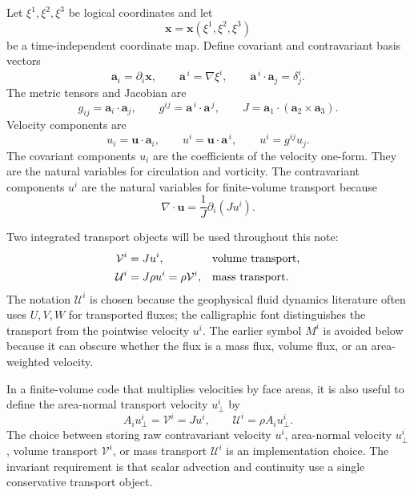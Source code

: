 \documentclass[11pt]{article}
\newcommand{\pd}{\partial}
\newcommand{\bvec}[1]{\bm{#1}}
\newcommand{\mc}[1]{\mathcal{#1}}
\newcommand{\Vflux}{\mc{V}}
\newcommand{\Uflux}{\mc{U}}
\begin{document}
Let \(\xi^1,\xi^2,\xi^3\) be logical coordinates and let
\begin{equation}
  \bvec{x}=\bvec{x}(\xi^1,\xi^2,\xi^3)
\end{equation}
be a time-independent coordinate map.  Define covariant and contravariant basis vectors
\begin{equation}
  \bvec{a}_i = \pd_i \bvec{x},
  \qquad
  \bvec{a}^{\,i} = \nabla \xi^i,
  \qquad
  \bvec{a}^{\,i}\cdot\bvec{a}_j=\delta^i_j.
\end{equation}
The metric tensors and Jacobian are
\begin{equation}
  g_{ij}=\bvec{a}_i\cdot\bvec{a}_j,
  \qquad
  g^{ij}=\bvec{a}^{\,i}\cdot\bvec{a}^{\,j},
  \qquad
  J=\bvec{a}_1\cdot(\bvec{a}_2\times\bvec{a}_3).
\end{equation}
Velocity components are
\begin{equation}
  u_i = \bvec{u}\cdot\bvec{a}_i,
  \qquad
  u^i = \bvec{u}\cdot\bvec{a}^{\,i},
  \qquad
  u^i = g^{ij} u_j.
\end{equation}
The covariant components \(u_i\) are the coefficients of the velocity one-form.  They are the natural variables for circulation and vorticity.  The contravariant components \(u^i\) are the natural variables for finite-volume transport because
\begin{equation}
  \nabla\cdot\bvec{u} = \frac{1}{J}\pd_i(Ju^i).
\end{equation}

Two integrated transport objects will be used throughout this note:
\begin{align}
  \Vflux^i &= J u^i,
  &&\hbox{volume transport},
  \label{eq:volume-transport} \\
  \Uflux^i &= J\rho u^i = \rho\Vflux^i,
  &&\hbox{mass transport}.
  \label{eq:mass-transport}
\end{align}
The notation \(\Uflux^i\) is chosen because the geophysical fluid dynamics literature often uses \(U,V,W\) for transported fluxes; the calligraphic font distinguishes the transport from the pointwise velocity \(u^i\).  The earlier symbol \(M^i\) is avoided below because it can obscure whether the flux is a mass flux, volume flux, or an area-weighted velocity.

In a finite-volume code that multiplies velocities by face areas, it is also useful to define the area-normal transport velocity \(u_\perp^i\) by
\begin{equation}
  A_i u_\perp^i = \Vflux^i = J u^i,
  \qquad
  \Uflux^i = \rho A_i u_\perp^i.
  \label{eq:area-normal-velocity}
\end{equation}
The choice between storing raw contravariant velocity \(u^i\), area-normal velocity \(u_\perp^i\), volume transport \(\Vflux^i\), or mass transport \(\Uflux^i\) is an implementation choice.  The invariant requirement is that scalar advection and continuity use a single conservative transport object.
\end{document}
